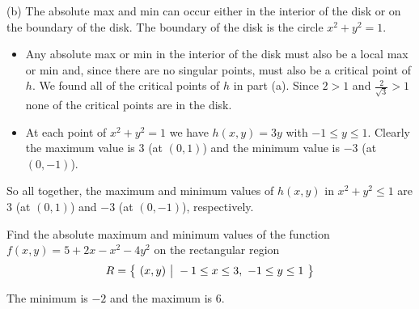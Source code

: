 \begin{solution}
(b) The absolute max and min can occur either in the interior
    of the disk or on the boundary of the disk. The boundary
    of the disk is the circle $x^2+y^2=1$.
\begin{itemize}
\item Any absolute max or min in the interior of the disk
      must also be a local max or min and, since there are no
      singular points, must also be a critical point of $h$.
      We found all of the critical points of $h$ in part (a).
      Since $2>1$ and $\frac{2}{\sqrt{3}}>1$ none of the critical
      points are in the disk.
\item At each point of $x^2+y^2=1$ we have 
           $h(x,y)=3y$ 
           with $-1\le y\le 1$. Clearly the maximum value is $3$
           (at $(0,1)$) and the minimum value is $-3$ (at $(0,-1)$). 
\end{itemize}
So all together, the maximum and minimum values of $h(x,y)$ in $x^2+y^2\le 1$
     are $3$ (at $(0,1)$) and  $-3$ (at $(0,-1)$), respectively.
\end{solution}

\begin{question}[M200 2012D] %
Find the absolute maximum and minimum
values of the function
$f(x, y) = 5 + 2x - x^2 - 4y^2$ on the rectangular region 
\begin{equation*}
R = \big\{ \ (x, y)\ \big|\  -1 \le x \le 3,\  -1 \le y \le 1\ \big\}
\end{equation*}
\end{question}

%

\begin{answer}
The minimum is $-2$ and the maximum is $6$.
\end{answer}

